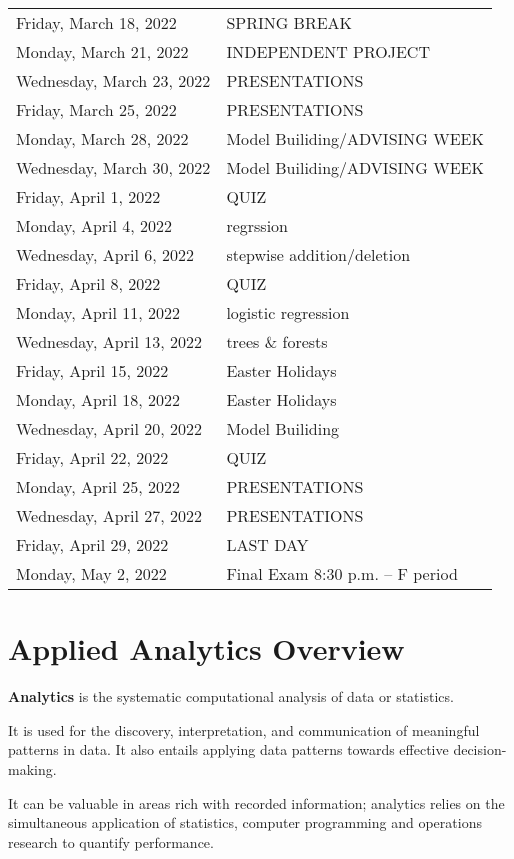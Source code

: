 \documentclass[
]{book}
\theoremstyle{definition}
\theoremstyle{definition}
\theoremstyle{definition}
\theoremstyle{definition}
\theoremstyle{remark}
\begin{document}
\begin{longtable}[]{@{}ll@{}}
Friday, March 18, 2022 & SPRING BREAK \\
Monday, March 21, 2022 & INDEPENDENT PROJECT \\
Wednesday, March 23, 2022 & PRESENTATIONS \\
Friday, March 25, 2022 & PRESENTATIONS \\
Monday, March 28, 2022 & Model Builiding/ADVISING WEEK \\
Wednesday, March 30, 2022 & Model Builiding/ADVISING WEEK \\
Friday, April 1, 2022 & QUIZ \\
Monday, April 4, 2022 & regrssion \\
Wednesday, April 6, 2022 & stepwise addition/deletion \\
Friday, April 8, 2022 & QUIZ \\
Monday, April 11, 2022 & logistic regression \\
Wednesday, April 13, 2022 & trees \& forests \\
Friday, April 15, 2022 & Easter Holidays \\
Monday, April 18, 2022 & Easter Holidays \\
Wednesday, April 20, 2022 & Model Builiding \\
Friday, April 22, 2022 & QUIZ \\
Monday, April 25, 2022 & PRESENTATIONS \\
Wednesday, April 27, 2022 & PRESENTATIONS \\
Friday, April 29, 2022 & LAST DAY \\
Monday, May 2, 2022 & Final Exam 8:30 p.m. -- F period \\
\bottomrule
\end{longtable}

\hypertarget{applied-analytics-overview}{%
\chapter{Applied Analytics Overview}\label{applied-analytics-overview}}

\textbf{Analytics} is the systematic computational analysis of data or statistics.

It is used for the discovery, interpretation, and communication of meaningful patterns in data. It also entails applying data patterns towards effective decision-making.

It can be valuable in areas rich with recorded information; analytics relies on the simultaneous application of statistics, computer programming and operations research to quantify performance.
\end{document}
